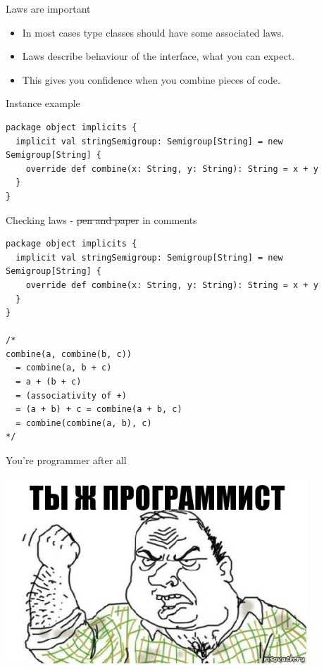 \documentclass[presentation,aspectratio=169,smaller]{beamer}
\begin{document}
\begin{frame}[label={sec:orgc8690ce}]{Laws are important}
\begin{itemize}
\item In most cases type classes should have some associated laws.
\item Laws describe behaviour of the interface, what you can expect.
\item This gives you confidence when you combine pieces of code.
\end{itemize}
\end{frame}

\begin{frame}[label={sec:orgc2edce0},fragile]{Instance example}
 \begin{verbatim}
package object implicits {
  implicit val stringSemigroup: Semigroup[String] = new Semigroup[String] {
    override def combine(x: String, y: String): String = x + y
  }
}
\end{verbatim}
\end{frame}

\begin{frame}[label={sec:org6e16e2c},fragile]{Checking laws - \sout{pen and paper} in comments}
 \begin{verbatim}
package object implicits {
  implicit val stringSemigroup: Semigroup[String] = new Semigroup[String] {
    override def combine(x: String, y: String): String = x + y
  }
}

/*
combine(a, combine(b, c))
  = combine(a, b + c)
  = a + (b + c)
  = (associativity of +)
  = (a + b) + c = combine(a + b, c)
  = combine(combine(a, b), c)
*/
\end{verbatim}
\end{frame}

\begin{frame}[label={sec:orgc276e31}]{You're programmer after all}
\begin{center}
\includegraphics[height=7cm]{images/you-re-programmer.jpg}
\end{center}
\end{frame}
\end{document}

